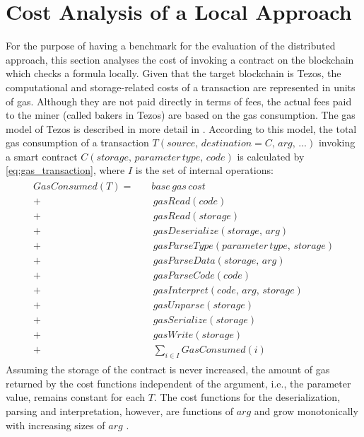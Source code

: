 \section{Cost Analysis of a Local Approach}\label{sec:usecase_cost}
For the purpose of having a benchmark for the evaluation of the distributed approach, this section analyses the cost of invoking a contract on the blockchain which checks a formula locally. Given that the target blockchain is Tezos, the computational and storage-related costs of a transaction are represented in units of gas. Although they are not paid directly in terms of fees, the actual fees paid to the miner (called bakers in Tezos) are based on the gas consumption. The gas model of Tezos is described in more detail in . According to this model, the total gas consumption of a transaction $T(source,\, destination=C,\, arg, \, ...)$ invoking a smart contract $C(storage, \, parameter\, type, \, code)$ is calculated by \eqref{eq:gas_transaction}, where $I$ is the set of internal operations:
\begin{align}\label{eq:gas_transaction}
\begin{split}
GasConsumed(T) = \quad &base \, gas \, cost \\
+& \, gasRead(code) \\
+& \, gasRead(storage) \\
+& \, gasDeserialize(storage, \, arg) \\
+& \, gasParseType(parameter \, type, \, storage) \\
+& \, gasParseData(storage, \, arg) \\
+& \, gasParseCode(code) \\
+& \, gasInterpret(code, \, arg, \, storage) \\
+& \, gasUnparse(storage) \\
+& \, gasSerialize(storage) \\
+& \, gasWrite(storage) \\
+& \, \sum_{i \in I} GasConsumed(i)
\end{split}
\end{align}
Assuming the storage of the contract is never increased, the amount of gas returned by the cost functions independent of the argument, i.e., the parameter value, remains constant for each $T$. The cost functions for the deserialization, parsing and interpretation, however, are functions of $arg$ and grow monotonically with increasing sizes of $arg$ \cite{morley_gasmodel}\cite{tezos_repo}.

